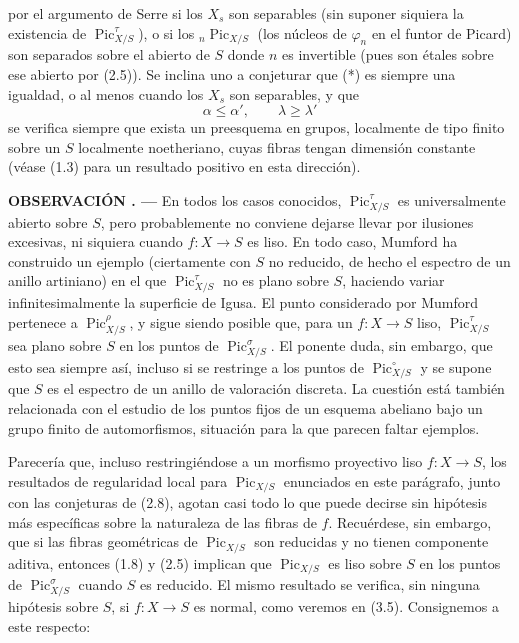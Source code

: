 \documentclass[11pt,twoside,openany]{book}
\numberwithin{equation}{section}
\newcommand{\src}[1]{%
  \phantomsection\hypertarget{src:#1}{}%
  \marginpar{\raggedleft\footnotesize\sffamily #1}%
}
\theoremstyle{plain}
\theoremstyle{definition}
\theoremstyle{remark}
\newcommand{\result}[2]{%
  \par\medskip\noindent\textbf{#1%
  \if\relax\detokenize{#2}\relax\else\space#2\fi. ---}\enspace
}
\newcommand{\FgaUnitKey}{frontmatter}
\renewcommand{\src}[1]{%
  \phantomsection\hypertarget{src:\FgaUnitKey:#1}{}%
  \marginpar{\raggedleft\footnotesize\sffamily #1}%
}
\theoremstyle{plain}
\theoremstyle{definition}
\theoremstyle{remark}
\begin{document}
\src{235}
por el argumento de Serre si los $X_s$ son separables (sin suponer siquiera la
existencia de $\operatorname{Pic}_{X/S}^\tau$), o si los
$ {}_n\operatorname{Pic}_{X/S}$ (los núcleos de $\varphi_n$ en el funtor de
Picard) son separados sobre el abierto de $S$ donde $n$ es invertible (pues son étales sobre ese abierto por (2.5)). Se
inclina uno a conjeturar que (*) es siempre una igualdad, o al menos cuando los
$X_s$ son separables, y que
\[
\tag{***}\alpha\leq\alpha',\qquad\lambda\geq\lambda'
\]
se verifica siempre que exista un preesquema en grupos, localmente de tipo
finito sobre un $S$ localmente noetheriano, cuyas fibras tengan dimensión
constante (véase (1.3) para un resultado positivo en esta dirección).

\result{OBSERVACIÓN}{2.9} En todos los casos conocidos,
$\operatorname{Pic}_{X/S}^\tau$ es universalmente abierto sobre $S$, pero
probablemente no conviene dejarse llevar por ilusiones excesivas, ni siquiera
cuando $f:X\longrightarrow S$ es liso. En todo caso, Mumford ha construido un
ejemplo (ciertamente con $S$ no reducido, de hecho el espectro de un anillo
artiniano) en el que $\operatorname{Pic}_{X/S}^\tau$ no es plano sobre $S$,
haciendo variar infinitesimalmente la superficie de Igusa. El punto considerado
por Mumford pertenece a $\operatorname{Pic}_{X/S}^\rho$, y sigue siendo posible
que, para un $f:X\longrightarrow S$ liso, $\operatorname{Pic}_{X/S}^\tau$ sea
plano sobre $S$ en los puntos de $\operatorname{Pic}_{X/S}^\sigma$. El ponente
duda, sin embargo, que esto sea siempre así, incluso si se restringe a los
puntos de $\operatorname{Pic}_{X/S}^\circ$ y se supone que $S$ es el espectro
de un anillo de valoración discreta. La cuestión está también relacionada con
el estudio de los puntos fijos de un esquema abeliano bajo un grupo finito de
automorfismos, situación para la que parecen faltar ejemplos.

Parecería que, incluso restringiéndose a un morfismo proyectivo liso
$f:X\longrightarrow S$, los resultados de regularidad local para
$\operatorname{Pic}_{X/S}$ enunciados en este parágrafo, junto con las
conjeturas de (2.8), agotan casi todo lo que puede decirse sin hipótesis más
específicas sobre la naturaleza de las fibras de $f$. Recuérdese, sin embargo,
que si las fibras geométricas de $\operatorname{Pic}_{X/S}$ son reducidas y no
tienen componente aditiva, entonces (1.8) y (2.5) implican que
$\operatorname{Pic}_{X/S}$ es liso sobre $S$ en los puntos de
$\operatorname{Pic}_{X/S}^\sigma$ cuando $S$ es reducido. El mismo resultado se
verifica, sin ninguna hipótesis sobre $S$, si $f:X\longrightarrow S$ es normal,
como veremos en (3.5). Consignemos a este respecto:
\end{document}
